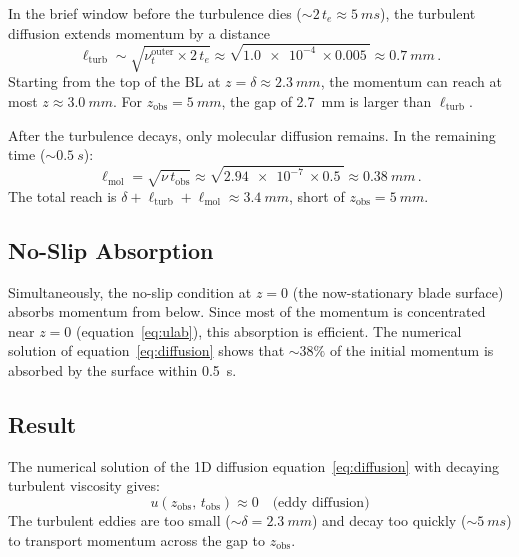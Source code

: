 \documentclass[11pt,a4paper]{article}
\begin{document}
In the brief window before the turbulence dies ($\sim 2\,t_e \approx
\SI{5}{ms}$), the turbulent diffusion extends momentum by a distance
\begin{equation}
  \ell_\mathrm{turb} \sim \sqrt{\nu_t^\mathrm{outer} \times 2\,t_e}
  \approx \sqrt{\SI{1.0e-4}{} \times \SI{0.005}{}}
  \approx \SI{0.7}{mm}\,.
  \label{eq:ell_turb}
\end{equation}
Starting from the top of the BL at $z = \delta \approx \SI{2.3}{mm}$,
the momentum can reach at most $z \approx \SI{3.0}{mm}$. For
$z_\mathrm{obs} = \SI{5}{mm}$, the gap of \SI{2.7}{mm} is larger
than $\ell_\mathrm{turb}$.

After the turbulence decays, only molecular diffusion remains. In the
remaining time ($\sim \SI{0.5}{s}$):
\begin{equation}
  \ell_\mathrm{mol} = \sqrt{\nu\, t_\mathrm{obs}}
  \approx \sqrt{\SI{2.94e-7}{} \times \SI{0.5}{}}
  \approx \SI{0.38}{mm}\,.
  \label{eq:ell_mol}
\end{equation}
The total reach is $\delta + \ell_\mathrm{turb} + \ell_\mathrm{mol}
\approx \SI{3.4}{mm}$, short of $z_\mathrm{obs} = \SI{5}{mm}$.

\subsection{No-Slip Absorption}

Simultaneously, the no-slip condition at $z = 0$ (the now-stationary
blade surface) absorbs momentum from below. Since most of the momentum
is concentrated near $z = 0$ (equation~\ref{eq:ulab}), this absorption
is efficient. The numerical solution of equation~\eqref{eq:diffusion}
shows that $\sim 38\%$ of the initial momentum is absorbed by the
surface within \SI{0.5}{s}.

\subsection{Result}

The numerical solution of the 1D diffusion
equation~\eqref{eq:diffusion} with decaying turbulent viscosity gives:
\begin{equation}
  \boxed{u(z_\mathrm{obs},\, t_\mathrm{obs})
    \approx 0 \quad \text{(eddy diffusion)}}
\end{equation}
The turbulent eddies are too small ($\sim\delta = \SI{2.3}{mm}$) and
decay too quickly ($\sim\SI{5}{ms}$) to transport momentum across
the gap to $z_\mathrm{obs}$.
\end{document}
